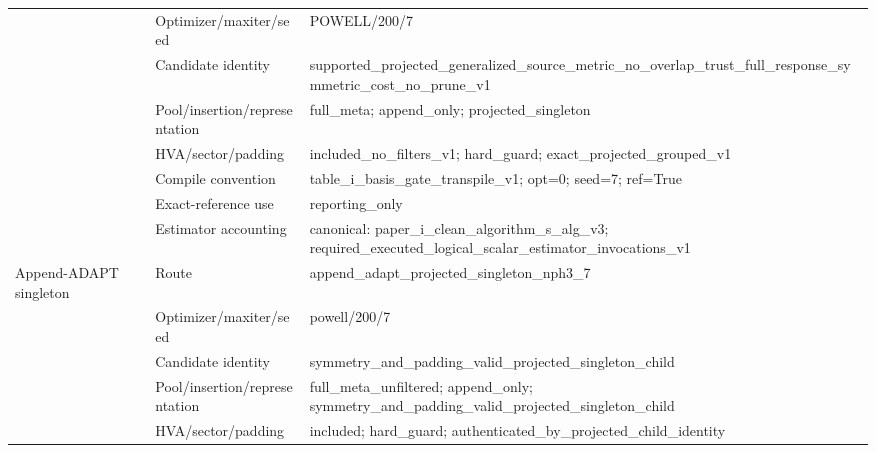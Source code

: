 \documentclass[10pt,letterpaper]{article}
\begin{document}
\begin{longtable}{@{}>{\raggedright\arraybackslash}p{0.9in}>{\raggedright\arraybackslash}p{1.65in}>{\raggedright\arraybackslash}p{4.7in}@{}}
 & Optimizer/maxiter/seed & POWELL/\allowbreak{}200/\allowbreak{}7 \\
 & Candidate identity & supported\_\allowbreak{}projected\_\allowbreak{}generalized\_\allowbreak{}source\_\allowbreak{}metric\_\allowbreak{}no\_\allowbreak{}overlap\_\allowbreak{}trust\_\allowbreak{}full\_\allowbreak{}response\_\allowbreak{}symmetric\_\allowbreak{}cost\_\allowbreak{}no\_\allowbreak{}prune\_\allowbreak{}v1 \\
 & Pool/insertion/representation & full\_\allowbreak{}meta;\allowbreak{} append\_\allowbreak{}only;\allowbreak{} projected\_\allowbreak{}singleton \\
 & HVA/sector/padding & included\_\allowbreak{}no\_\allowbreak{}filters\_\allowbreak{}v1;\allowbreak{} hard\_\allowbreak{}guard;\allowbreak{} exact\_\allowbreak{}projected\_\allowbreak{}grouped\_\allowbreak{}v1 \\
 & Compile convention & table\_\allowbreak{}i\_\allowbreak{}basis\_\allowbreak{}gate\_\allowbreak{}transpile\_\allowbreak{}v1;\allowbreak{} opt=0;\allowbreak{} seed=7;\allowbreak{} ref=True \\
 & Exact-reference use & reporting\_\allowbreak{}only \\
 & Estimator accounting & canonical:\allowbreak{} paper\_\allowbreak{}i\_\allowbreak{}clean\_\allowbreak{}algorithm\_\allowbreak{}s\_\allowbreak{}alg\_\allowbreak{}v3;\allowbreak{} required\_\allowbreak{}executed\_\allowbreak{}logical\_\allowbreak{}scalar\_\allowbreak{}estimator\_\allowbreak{}invocations\_\allowbreak{}v1 \\
\addlinespace[2pt]
Append-ADAPT singleton & Route & append\_\allowbreak{}adapt\_\allowbreak{}projected\_\allowbreak{}singleton\_\allowbreak{}nph3\_\allowbreak{}7 \\
 & Optimizer/maxiter/seed & powell/\allowbreak{}200/\allowbreak{}7 \\
 & Candidate identity & symmetry\_\allowbreak{}and\_\allowbreak{}padding\_\allowbreak{}valid\_\allowbreak{}projected\_\allowbreak{}singleton\_\allowbreak{}child \\
 & Pool/insertion/representation & full\_\allowbreak{}meta\_\allowbreak{}unfiltered;\allowbreak{} append\_\allowbreak{}only;\allowbreak{} symmetry\_\allowbreak{}and\_\allowbreak{}padding\_\allowbreak{}valid\_\allowbreak{}projected\_\allowbreak{}singleton\_\allowbreak{}child \\
 & HVA/sector/padding & included;\allowbreak{} hard\_\allowbreak{}guard;\allowbreak{} authenticated\_\allowbreak{}by\_\allowbreak{}projected\_\allowbreak{}child\_\allowbreak{}identity \\

\end{longtable}
\end{document}
